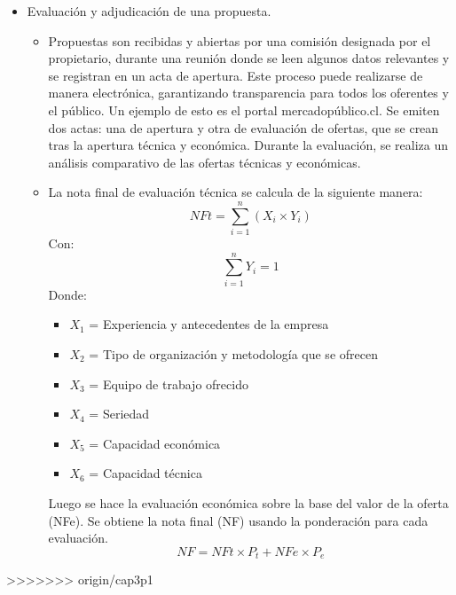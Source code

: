 \documentclass{article} %
\begin{document}
\begin{enumerate}
\begin{itemize}
        \item Evaluación y adjudicación de una propuesta.
        \begin{itemize}
            \item Propuestas son recibidas y abiertas por una comisión designada por el propietario, durante una reunión donde se leen algunos datos relevantes y se registran en un acta de apertura. Este proceso puede realizarse de manera electrónica, garantizando transparencia para todos los oferentes y el público. Un ejemplo de esto es el portal mercadopúblico.cl. Se emiten dos actas: una de apertura y otra de evaluación de ofertas, que se crean tras la apertura técnica y económica. Durante la evaluación, se realiza un análisis comparativo de las ofertas técnicas y económicas.
            \item La nota final de evaluación técnica se calcula de la siguiente manera:
            \begin{equation}
                NFt = \sum_{i=1}^{n} (X_i \times Y_i)
            \end{equation}
            Con:
            \begin{equation}
                \sum_{i=1}^{n} Y_i = 1 
            \end{equation}
            Donde:
            \begin{itemize}
                \item $X_1$ = Experiencia y antecedentes de la empresa
                \item $X_2$ = Tipo de organización y metodología que se ofrecen
                \item $X_3$ = Equipo de trabajo ofrecido
                \item $X_4$ = Seriedad
                \item $X_5$ = Capacidad económica
                \item $X_6$ = Capacidad técnica
            \end{itemize}
            Luego se hace la evaluación económica sobre la base del valor de la oferta (NFe).
            Se obtiene la nota final (NF) usando la ponderación para cada evaluación.
            \begin{equation}
                NF = NFt \times P_t + NFe \times P_e
            \end{equation}
        \end{itemize}
    \end{itemize}
\end{enumerate}
























>>>>>>> origin/cap3p1
\end{document}
